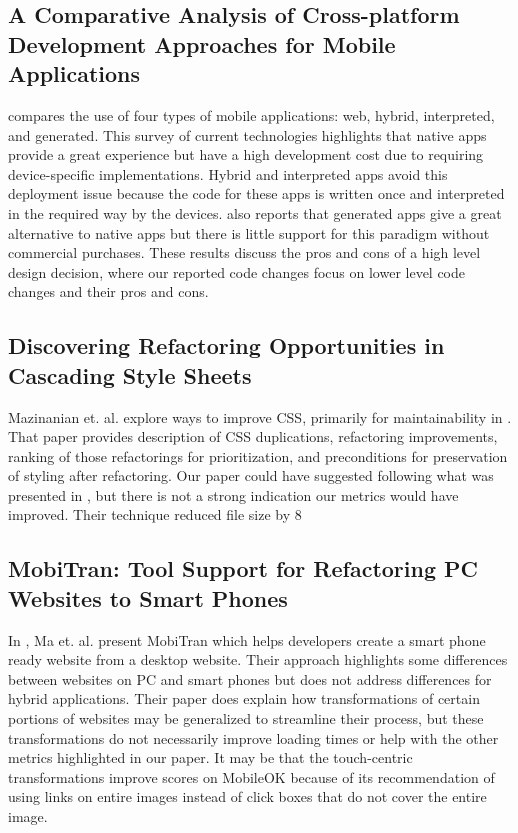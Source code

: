 \documentclass{acm_proc_article-sp}
\begin{document}
\subsection{A Comparative Analysis of Cross-platform Development Approaches for Mobile Applications \cite{Xanthopoulos:2013:CAC:2490257.2490292}}
\cite{Xanthopoulos:2013:CAC:2490257.2490292} compares the use of four types of mobile applications: web, hybrid, interpreted, and generated. 
This survey of current technologies highlights that native apps provide a great experience but have a high development cost due to requiring device-specific implementations.
Hybrid and interpreted apps avoid this deployment issue because the code for these apps is written once and interpreted in the required way by the devices. 
\cite{Xanthopoulos:2013:CAC:2490257.2490292} also reports that generated apps give a great alternative to native apps but there is little support for this paradigm without commercial purchases. 
These results discuss the pros and cons of a high level design decision, where our reported code changes focus on lower level code changes and their pros and cons.

\subsection{Discovering Refactoring Opportunities in Cascading Style Sheets \cite{Mazinanian:2014:DRO:2635868.2635879}}
Mazinanian et. al. explore ways to improve CSS, primarily for maintainability in \cite{Mazinanian:2014:DRO:2635868.2635879}. 
That paper provides description of CSS duplications, refactoring improvements, ranking of those refactorings for prioritization, and preconditions for preservation of styling after refactoring.
Our paper could have suggested following what was presented in \cite{Mazinanian:2014:DRO:2635868.2635879}, but there is not a strong indication our metrics would have improved.
Their technique reduced file size by 8%

\subsection{MobiTran: Tool Support for Refactoring PC Websites to Smart Phones \cite{Ma:2013:MTS:2541614.2541621}}
In \cite{Ma:2013:MTS:2541614.2541621}, Ma et. al. present MobiTran which helps developers create a smart phone ready website from a desktop website. 
Their approach highlights some differences between websites on PC and smart phones but does not address differences for hybrid applications. 
Their paper does explain how transformations of certain portions of websites may be generalized to streamline their process, but these transformations do not necessarily improve loading times or help with the other metrics highlighted in our paper. 
It may be that the touch-centric transformations improve scores on MobileOK because of its recommendation of using links on entire images instead of click boxes that do not cover the entire image.
\end{document}
